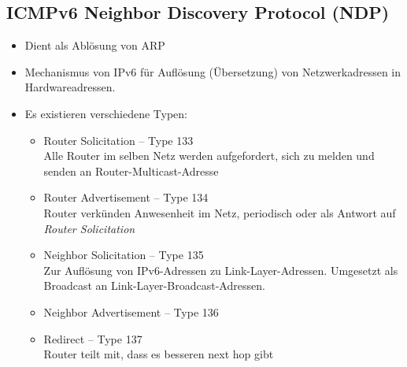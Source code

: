 \documentclass{article} %
\begin{document}
\subsection{ICMPv6 Neighbor Discovery Protocol (NDP)} 
\begin{itemize}
	\item Dient als Ablösung von ARP
	\item Mechanismus von IPv6 für Auflösung (Übersetzung) von Netzwerkadressen in Hardwareadressen.
	\item Es existieren verschiedene Typen:
		\begin{itemize}
		\item Router Solicitation – Type 133 \\
		Alle Router im selben Netz werden aufgefordert, sich zu melden und senden an Router-Multicast-Adresse 
		\item Router Advertisement – Type 134 \\
		Router verkünden Anwesenheit im Netz, periodisch oder als Antwort auf \textit{Router Solicitation} 		
		\item Neighbor Solicitation – Type 135 \\
		Zur Auflösung von IPv6-Adressen zu Link-Layer-Adressen. Umgesetzt als Broadcast an Link-Layer-Broadcast-Adressen.
		\item Neighbor Advertisement – Type 136 
		\item Redirect – Type 137 \\
		Router teilt mit, dass es besseren next hop gibt 
		\end{itemize}
	
	
\end{itemize}
\end{document}
